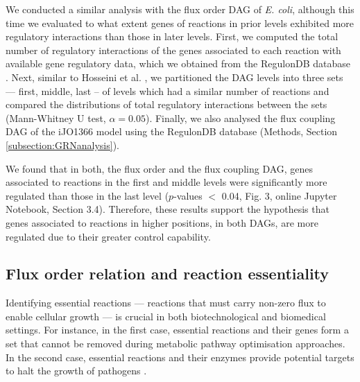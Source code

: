 \documentclass[12pt]{article}
\begin{document}
We conducted a similar analysis with the flux order DAG of \emph{E. coli}, although this time we evaluated to what extent genes of reactions in prior levels exhibited more regulatory interactions than those in later levels. First, we computed the total number of regulatory interactions of the genes associated to each reaction with available gene regulatory data, which we obtained from the RegulonDB database \cite{Gama-Castro2016}. Next, similar to Hosseini et al. \cite{Hosseini2015}, we partitioned the DAG levels into three sets --- first, middle, last -- of levels which had a similar number of reactions and compared the distributions of total regulatory interactions between the sets (Mann-Whitney U test, $\alpha = 0.05$). Finally, we also analysed the flux coupling DAG of the iJO1366 model using the RegulonDB database (Methods, Section \ref{subsection:GRNanalysis}).

We found that in both, the flux order and the flux coupling DAG, genes associated to reactions in the first and middle levels were significantly more regulated than those in the last level ($p$-values $<$ 0.04, Fig. 3, online Jupyter Notebook, Section 3.4). Therefore, these results support the hypothesis that genes associated to reactions in higher positions, in both DAGs, are more regulated due to their greater control capability.

\subsection{Flux order relation and reaction essentiality}
Identifying essential reactions --- reactions that must carry non-zero flux to enable cellular growth --- is crucial in both biotechnological and biomedical settings. For instance, in the first case, essential reactions and their genes form a set that cannot be removed during metabolic pathway optimisation approaches. In the second case, essential reactions and their enzymes provide potential targets to halt the growth of pathogens \cite{Gatto2015,Salleh2013,Xavier2018}.
\end{document}
